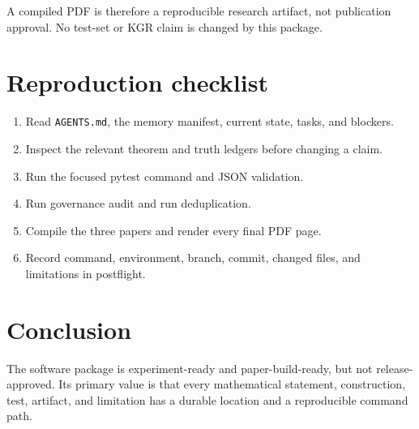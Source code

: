 \documentclass[11pt]{amsart}
\begin{document}
A compiled PDF is therefore a reproducible research artifact, not publication
approval. No test-set or KGR claim is changed by this package.

\section{Reproduction checklist}

\begin{enumerate}[leftmargin=*]
\item Read \texttt{AGENTS.md}, the memory manifest, current state, tasks, and blockers.
\item Inspect the relevant theorem and truth ledgers before changing a claim.
\item Run the focused pytest command and JSON validation.
\item Run governance audit and run deduplication.
\item Compile the three papers and render every final PDF page.
\item Record command, environment, branch, commit, changed files, and limitations in postflight.
\end{enumerate}

\section{Conclusion}

The software package is experiment-ready and paper-build-ready, but not
release-approved. Its primary value is that every mathematical statement,
construction, test, artifact, and limitation has a durable location and a
reproducible command path.

\nocite{SIAMReproducibility2026,Higham2002,MooreKearfottCloud2009}


\end{document}
